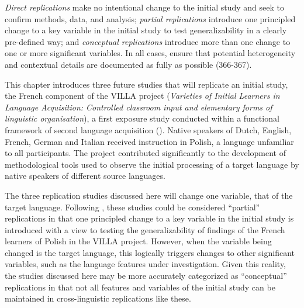 \documentclass[output=paper,colorlinks,citecolor=brown,modfonts,nonflat]{../langscibook}
\begin{document}
\textit{Direct replications} make no intentional change to the initial study and seek to confirm methods, data, and analysis; \textit{partial replications} introduce one principled change to a key variable in the initial study to test generalizability in a clearly pre-defined way; and \textit{conceptual replications} introduce more than one change to one or more significant variables. In all cases, ensure that potential heterogeneity and contextual details are documented as fully as possible (366-367).


This chapter introduces three future studies that will replicate an initial study, the French component of the VILLA project (\textit{Varieties of Initial Learners in Language Acquisition: Controlled classroom input and elementary forms of linguistic organisation}), a first exposure study conducted within a functional framework of second language acquisition (\citealt{Perdue1993,Watorek2004,Dimroth2013}). Native speakers of Dutch, English, French, German and Italian received instruction in Polish, a language unfamiliar to all participants. The project contributed significantly to the development of methodological tools used to observe the initial processing of a target language by native speakers of different source languages.

The three replication studies discussed here will change one variable, that of the target language. Following \citet{MarsdenEtAl2018Replication}, these studies could be considered “partial” replications in that one principled change to a key variable in the initial study is introduced with a view to testing the generalizability of findings of the French learners of Polish in the VILLA project. However, when the variable being changed is the target language, this logically triggers changes to other significant variables, such as the language features under investigation. Given this reality, the studies discussed here may be more accurately categorized as “conceptual” replications in that not all features and variables of the initial study can be maintained in cross-linguistic replications like these.
\end{document}
